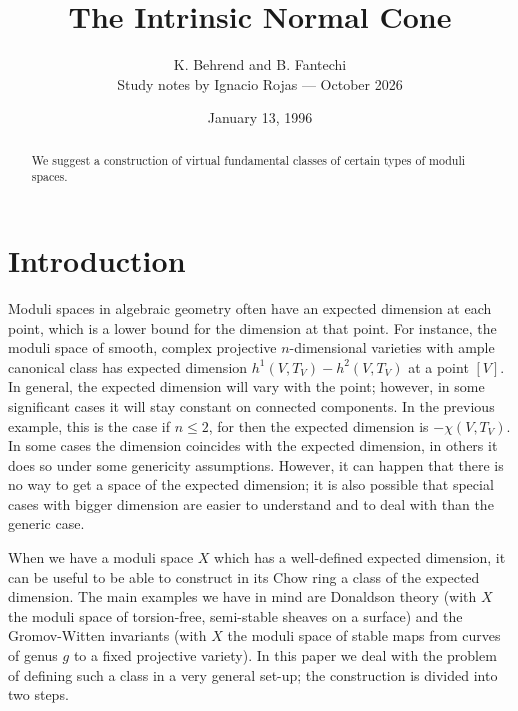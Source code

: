 \documentclass[11pt]{article}
\title{The Intrinsic Normal Cone}
\author{K. Behrend and B. Fantechi\\[.65em]
  {\small Study notes by Ignacio Rojas --- October 2026}}
\theoremstyle{plain}
\theoremstyle{definition}
\newcommand{\red}[1]{\textcolor{red}{#1}}
\theoremstyle{plain}
\theoremstyle{definition}
\newtheorem*{Qn}{Question}
\theoremstyle{remark}
\newcounter{passage}
\newcommand{\passagemark}{%
  \refstepcounter{passage}%
  \textsuperscript{\normalfont[\thepassage]}%
}
\begin{document}
\date{January 13, 1996}
\maketitle
\begin{abstract}
We suggest a  construction of  virtual fundamental classes
of certain types of moduli spaces.
\end{abstract}
\tableofcontents
\section{Introduction}

Moduli spaces in algebraic geometry often have an expected dimension
at each point, which is a lower bound for the dimension at that
point. For instance, the moduli space of smooth, complex projective
\(n\)-dimensional varieties with ample canonical class has expected
dimension \(h^1(V,T_V)-h^2(V,T_V)\) at a point \([V]\). In general, the
expected dimension will vary with the point; however, in some
significant cases it will stay constant on connected components. In
the previous example, this is the case if \(n\le 2\), for then the
expected dimension is \(-\chi(V,T_V)\). In some cases the dimension
coincides with the expected dimension, in others it does so under some
genericity assumptions. However, it can happen that there is no way to
get a space of the expected dimension; it is also possible that
special cases with bigger dimension are easier to understand and to
deal with than the generic case.

When we have a moduli space \(X\) which has a well-defined expected
dimension, it can be useful to be able to construct in its Chow ring a
class of the expected dimension. The main examples we have in mind are
Donaldson theory (with \(X\) the moduli space of torsion-free,
semi-stable sheaves on a surface) and the Gromov-Witten invariants
(with \(X\) the moduli space of stable maps from curves of genus \(g\) to
a fixed projective variety).  In this paper we deal with the problem
of defining such a class in a very general set-up; the construction is
divided into two steps.
\end{document}
